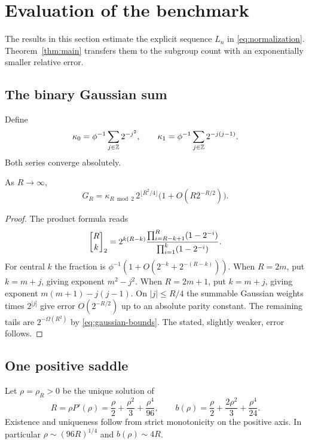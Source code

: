 \section{Evaluation of the benchmark}\label{sec:analysis}
The results in this section estimate the explicit sequence $L_n$ in
\eqref{eq:normalization}. Theorem~\ref{thm:main} transfers them to the subgroup count with an
exponentially smaller relative error.

\subsection{The binary Gaussian sum}
Define
\begin{equation}\label{eq:theta-constants}
 \kappa_0=\phi^{-1}\sum_{j\in\mathbb Z}2^{-j^2},\qquad
 \kappa_1=\phi^{-1}\sum_{j\in\mathbb Z}2^{-j(j-1)}.
\end{equation}
Both series converge absolutely.
\begin{lemma}\label{lem:Gaussian-asymptotic}
As $R\to\infty$,
\[
 G_R=\kappa_{R\bmod2}\,2^{\lfloor R^2/4\rfloor}
            \bigl(1+O(R2^{-R/2})\bigr).
\]
\end{lemma}
\begin{proof}
The product formula reads
\[
 \gauss Rk2=2^{k(R-k)}
 \frac{\prod_{i=R-k+1}^R(1-2^{-i})}
      {\prod_{i=1}^k(1-2^{-i})}.
\]
For central $k$ the fraction is
$\phi^{-1}(1+O(2^{-k}+2^{-(R-k)}))$.
When $R=2m$, put $k=m+j$, giving exponent $m^2-j^2$.
When $R=2m+1$, put $k=m+j$, giving exponent
$m(m+1)-j(j-1)$. On $|j|\leq R/4$ the summable Gaussian weights
times $2^{|j|}$ give error $O(2^{-R/2})$ up to an absolute parity
constant. The remaining tails are $2^{-\Omega(R^2)}$ by
\eqref{eq:gaussian-bounds}. The stated, slightly weaker, error follows.
\end{proof}

\subsection{One positive saddle}
Let $\rho=\rho_R>0$ be the unique solution of
\begin{equation}\label{eq:saddle}
 R=\rho P'(\rho)=\frac\rho2+\frac{\rho^2}3+\frac{\rho^4}{96},
 \qquad b(\rho)=\frac\rho2+\frac{2\rho^2}3+\frac{\rho^4}{24}.
\end{equation}
Existence and uniqueness follow from strict monotonicity on the positive
axis. In particular $\rho\sim(96R)^{1/4}$ and $b(\rho)\sim4R$.

